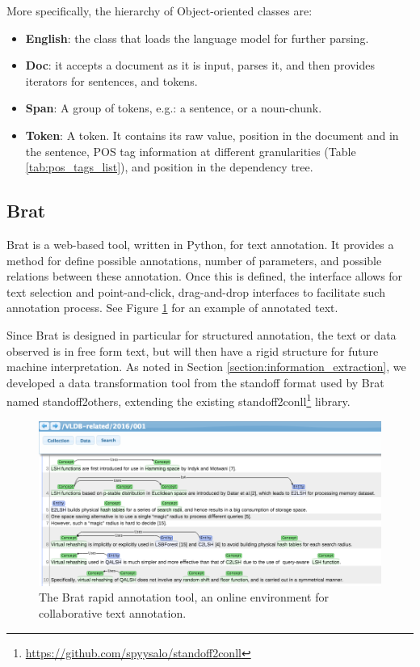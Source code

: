 \documentclass[11pt,a4paper,openright]{memoir}
\begin{document}
More specifically, the hierarchy of Object-oriented classes are:
\begin{itemize}
	\item \textbf{English}: the class that loads the language model for further parsing.
	\item \textbf{Doc}: it accepts a document as it is input, parses it, and then provides iterators for sentences, and tokens.
	\item \textbf{Span}: A group of tokens, e.g.: a sentence, or a noun-chunk.
	\item \textbf{Token}: A token. It contains its raw value, position in the document and in the sentence, POS tag information at different granularities (Table \ref{tab:pos_tags_list}), and position in the dependency tree.
\end{itemize}


\subsection{Brat}

Brat \cite{Stenetorp:2012:BWT:2380921.2380942} is a web-based tool, written in Python, for text annotation. It provides a method for define possible annotations, number of parameters, and possible relations between these annotation. Once this is defined, the interface allows for text selection and point-and-click, drag-and-drop interfaces to facilitate such annotation process. See Figure \ref{fig:brat_img} for an example of annotated text.

Since Brat is designed in particular for structured annotation, the text or data observed is in free form text, but will then have a rigid structure for future machine interpretation. As noted in Section \ref{section:information_extraction}, we developed a data transformation tool from the standoff format used by Brat named standoff2others, extending the existing standoff2conll\footnote{\url{https://github.com/spyysalo/standoff2conll}} library.

\begin{figure}[!htbp]
  \centering
    \includegraphics[width=1.0\textwidth]{./images/brat_img}
  \caption[The Brat rapid annotation tool, an online environment for collaborative text annotation.]{The Brat rapid annotation tool, an online environment for collaborative text annotation.}
  \label{fig:brat_img}
\end{figure}
\end{document}
